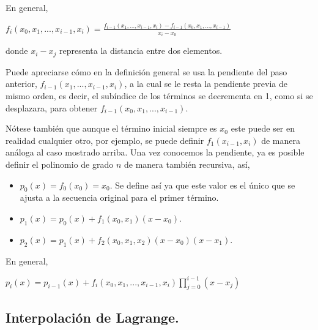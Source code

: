 \hspace{0.4cm} En general,

\begin{center}
$\displaystyle{f_{i}(x_{0},x_{1},...,x_{i-1},x_{i}) = \frac{f_{i-1}(x_{1},...,x_{i-1},x_{i})-f_{i-1}(x_{0},x_{1},...,x_{i-1} )}{x_{i}-x_{0}}}$
\end{center}


\noindent donde  $\displaystyle{x_{i}-x_{j}}$ representa la distancia entre dos elementos.

\hspace{0.4cm} Puede apreciarse c\'omo en la definici\'on general se usa la pendiente del paso anterior, $f_{i-1}(x_{1},...,x_{i-1},x_{i})$, a la cual se le resta la pendiente previa de mismo orden, es decir, el sub\'indice de los t\'erminos se decrementa en 1, como si se desplazara, para obtener $f_{i-1}(x_{0},x_{1},...,x_{i-1})$.

\hspace{0.4cm} N\'otese tambi\'en que aunque el t\'ermino inicial siempre es $x_{0}$ este puede ser en realidad cualquier otro, por ejemplo, se puede definir $f_{1}(x_{i-1},x_{i})$ de manera an\'aloga al caso mostrado arriba. Una vez conocemos la pendiente, ya es posible definir el polinomio de grado $n$ de manera tambi\'en recursiva, as\'i,

\begin{itemize}
  \item $p_{0}(x) = f_{0} (x_{0}) =x_{0}$.  Se define as\'i ya que este valor es el \'unico que se ajusta a la secuencia original para el primer t\'ermino. 
  \item $\displaystyle{p_{1}(x) = p_{0}(x) +  f_{1} (x_{0},x_{1}) (x-x_{0})}$.
  \item $\displaystyle{p_{2}(x) = p_{1}(x) +  f_{2} (x_{0},x_{1},x_{2}) (x-x_{0})(x-x_{1})}$.
\end{itemize}

\hspace{0.4cm} En general,

\begin{center}
$\displaystyle{p_{i}(x) = p_{i-1}(x) +  f_{i} (x_{0},x_{1},...,x_{i-1},x_{i}) \prod_{j=0}^{i-1}(x-x_{j})}$
\end{center}


\subsection{Interpolaci\'on de Lagrange.\\}

